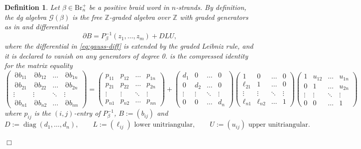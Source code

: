 \documentclass[11pt]{article}
\newtheorem{definition}[theorem]{Definition}
\newcommand{\ZZ}{\mathbb Z}
\newcommand{\diag}{\operatorname{diag}}
\newcommand{\cG}{\mathcal G}
\newcommand{\dd}{\operatorname{\partial}}
\begin{document}
\begin{definition}\label{def:gauss-dga}
Let $\beta\in\mbox{Br}^+_n$ be a positive braid word in $n$-strands. By definition, the dg algebra \(\cG(\beta)\) is the free $\ZZ$-graded algebra over $\ZZ$ with graded generators as in  and differential
\begin{equation}\label{eq:gauss-diff}
 \partial B=P^{-1}_\beta(z_1,\ldots,z_m)+DLU,
 \end{equation}
 where the differential in \eqref{eq:gauss-diff} is extended by the graded Leibniz rule, and it is declared to vanish on any generators of degree 0.  is the compressed identity for the matrix equality
 {\tiny
 \begin{equation*}
 \begin{pmatrix}
\dd b_{11} & \dd b_{12} & \dots & \dd  b_{1n} \\
\dd b_{21} &\dd  b_{22} & \dots &\dd  b_{2n} \\
\vdots & \vdots & \ddots & \vdots \\
\dd b_{n1} &\dd  b_{n2} & \dots &\dd  b_{nn}
\end{pmatrix}
=
\begin{pmatrix}
p_{11} & p_{12} & \dots & p_{1n} \\
p_{21} & p_{22} & \dots & p_{2n} \\
\vdots & \vdots & \ddots & \vdots \\
p_{n1} & p_{n2} & \dots & p_{nn}
\end{pmatrix}
+
\begin{pmatrix}
d_{1} & 0 & \dots & 0 \\
0 & d_{2} & \dots & 0 \\
\vdots & \vdots & \ddots & \vdots \\
0 & 0 & \dots & d_{n}
\end{pmatrix}
\begin{pmatrix}
1 & 0 & \dots & 0 \\
\ell_{21} & 1 & \dots & 0 \\
\vdots & \vdots & \ddots & \vdots \\
\ell_{n1} & \ell_{n2} & \dots & 1
\end{pmatrix}
\begin{pmatrix}
1 & u_{12} & \dots & u_{1n} \\
0 & 1 & \dots & u_{2n} \\
\vdots & \vdots & \ddots & \vdots \\
0 & 0 & \dots & 1
\end{pmatrix}
 \end{equation*}
 }
\noindent where $p_{ij}$ is the $(i,j)$-entry of $P_\beta^{-1}$, $B:=(b_{ij})$ and
  \[
 D:=\diag(d_1,\ldots,d_n),\qquad
 L:=(\ell_{ij})\text{ lower unitriangular},\qquad
 U:=(u_{ij})\text{ upper unitriangular}.
\]

 \hfill$\Box$
 \end{definition}
\end{document}
